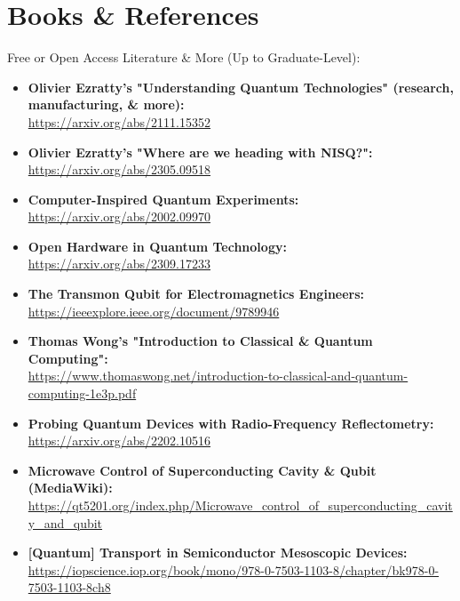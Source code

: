 \chapter{\LARGE{Books \& References}}

\large\begin{flushleft} Free or Open Access Literature \& More (Up to Graduate-Level):
\end{flushleft}

\normalsize\begin{itemize}

  \item\textbf{Olivier Ezratty's "Understanding Quantum Technologies" (research, manufacturing, \& more):}\\
\url{https://arxiv.org/abs/2111.15352}

  \item\textbf{Olivier Ezratty's "Where are we heading with NISQ?":}\\
\url{https://arxiv.org/abs/2305.09518}

  \item\textbf{Computer-Inspired Quantum Experiments:}\\
\url{https://arxiv.org/abs/2002.09970}

  \item\textbf{Open Hardware in Quantum Technology:}\\
\url{https://arxiv.org/abs/2309.17233}

  \item\textbf{The Transmon Qubit for Electromagnetics Engineers:}\\
\url{https://ieeexplore.ieee.org/document/9789946}

  \item\textbf{Thomas Wong's "Introduction to Classical \& Quantum Computing":}\\
\url{https://www.thomaswong.net/introduction-to-classical-and-quantum-computing-1e3p.pdf}

  \item\textbf{Probing Quantum Devices with Radio-Frequency Reflectometry:}\\
\url{https://arxiv.org/abs/2202.10516}

  \item\textbf{Microwave Control of Superconducting Cavity \& Qubit (MediaWiki):}\\
\url{https://qt5201.org/index.php/Microwave_control_of_superconducting_cavity_and_qubit}

  \item\textbf{[Quantum] Transport in Semiconductor Mesoscopic Devices:}\\
\url{https://iopscience.iop.org/book/mono/978-0-7503-1103-8/chapter/bk978-0-7503-1103-8ch8}


\end{itemize}
